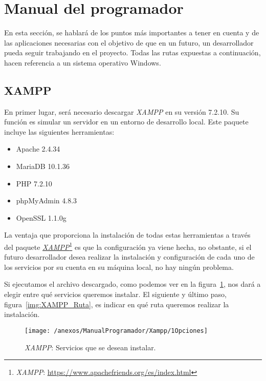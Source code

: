 \section{Manual del programador}

En esta sección, se hablará de los puntos más importantes a tener en cuenta y de las aplicaciones necesarias con el objetivo de que en un futuro, un desarrollador pueda seguir trabajando en el proyecto. Todas las rutas expuestas a continuación, hacen referencia a un sistema operativo Windows.

\subsection{XAMPP}

En primer lugar, será necesario descargar \textit{XAMPP} en su versión 7.2.10. Su función es simular un servidor en un entorno de desarrollo local. Este paquete incluye las siguientes herramientas:

\begin{itemize}
	\item Apache 2.4.34
	\item MariaDB 10.1.36
	\item PHP 7.2.10
	\item phpMyAdmin 4.8.3
	\item OpenSSL 1.1.0g
\end{itemize}

La ventaja que proporciona la instalación de todas estas herramientas a través del paquete \href{https://www.apachefriends.org/es/index.html}{\textit{XAMPP}}\footnote{\textit{XAMPP}: \url{https://www.apachefriends.org/es/index.html}} es que la configuración ya viene hecha, no obstante, si el futuro desarrollador desea realizar la instalación y configuración de cada uno de los servicios por su cuenta en su máquina local, no hay ningún problema.

Si ejecutamos el archivo descargado, como podemos ver en la figura~\ref{img:XAMPP_Opciones}, nos dará a elegir entre qué servicios queremos instalar. El siguiente y último paso, figura~\ref{img:XAMPP_Ruta}, es indicar en qué ruta queremos realizar la instalación. 

\begin{figure}[h]
	\centering
	\texttt{[image: /anexos/ManualProgramador/Xampp/1Opciones]}
	\caption{\textit{XAMPP}: Servicios que se desean instalar.}
	\label{img:XAMPP_Opciones}
\end{figure}

